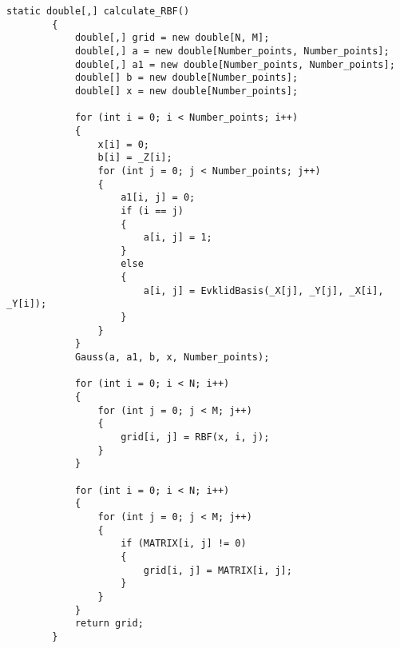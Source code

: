 \begin{lstlisting}[caption={Метод интерполяции с помощью радиально-базисной функции}, label={ls:a:02}]
 static double[,] calculate_RBF()
        {
            double[,] grid = new double[N, M];
            double[,] a = new double[Number_points, Number_points];
            double[,] a1 = new double[Number_points, Number_points];
            double[] b = new double[Number_points];
            double[] x = new double[Number_points];

            for (int i = 0; i < Number_points; i++)
            {
                x[i] = 0;
                b[i] = _Z[i];
                for (int j = 0; j < Number_points; j++)
                {
                    a1[i, j] = 0;
                    if (i == j)
                    {
                        a[i, j] = 1;
                    }
                    else
                    {
                        a[i, j] = EvklidBasis(_X[j], _Y[j], _X[i], _Y[i]);
                    }
                }
            }
            Gauss(a, a1, b, x, Number_points);
        
            for (int i = 0; i < N; i++)
            {
                for (int j = 0; j < M; j++)
                {
                    grid[i, j] = RBF(x, i, j);
                }
            }

            for (int i = 0; i < N; i++)
            {
                for (int j = 0; j < M; j++)
                {
                    if (MATRIX[i, j] != 0)
                    {
                        grid[i, j] = MATRIX[i, j];
                    }
                }
            }
            return grid;
        }
\end{lstlisting}